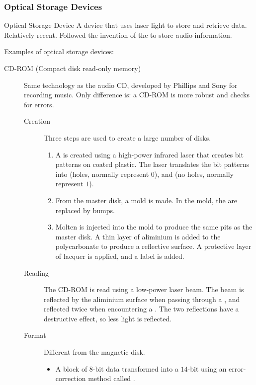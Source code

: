 \documentclass[../notes.tex]{subfiles}
\begin{document}
				\subsubsection{Optical Storage Devices}
					\begin{definition}{Optical Storage Device}
						A device that uses laser light to store and retrieve data. Relatively recent. Followed the invention of the  to store audio information. 
					\end{definition}
					Examples of optical storage devices:
					\begin{indentparagraph}
						\begin{description}
							\item[CD-ROM (Compact disk read-only memory)] Same technology as the audio CD, developed by Phillips and Sony for recording music. Only difference is: a CD-ROM is more robust and checks for errors.
								\begin{description}
									\item[Creation] Three steps are used to create a large number of disks.
										\begin{enumerate}[label=\alph*, nosep]
											\item A  is created using a high-power infrared laser that creates bit patterns on coated plastic. The laser translates the bit patterns into  (holes, normally represent $0$), and  (no holes, normally represent $1$).
											\item From the master disk, a mold is made. In the mold, the  are replaced by bumps.
											\item Molten  is injected into the mold to produce the same pits as the master disk. A thin layer of aliminium is added to the polycarbonate to produce a reflective surface. A protective layer of lacquer is applied, and a label is added. 
										\end{enumerate}
									\item[Reading] The CD-ROM is read using a low-power laser beam. The beam is reflected by the aliminium surface when passing through a , and reflected twice when encountering a . The two reflections have a destructive effect, so less light is reflected.
									\item[Format] Different from the magnetic disk.
										\begin{itemize}[nosep]
											\item A block of $8$-bit data transformed into a $14$-bit  using an error-correction method called .

\end{itemize}
\end{description}
\end{description}
\end{indentparagraph}
\end{document}
